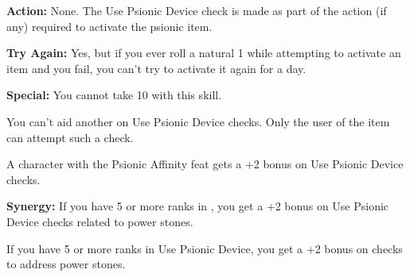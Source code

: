 \textbf{Action:} None. The Use Psionic Device check is made as part of the action (if any) required to activate the psionic item.

\textbf{Try Again:} Yes, but if you ever roll a natural 1 while attempting to activate an item and you fail, you can’t try to activate it again for a day.

\textbf{Special:} You cannot take 10 with this skill.

You can’t aid another on Use Psionic Device checks. Only the user of the item can attempt such a check.

A character with the Psionic Affinity feat gets a +2 bonus on Use Psionic Device checks.

\textbf{Synergy:} If you have 5 or more ranks in , you get a +2 bonus on Use Psionic Device checks related to power stones.

If you have 5 or more ranks in Use Psionic Device, you get a +2 bonus on  checks to address power stones.